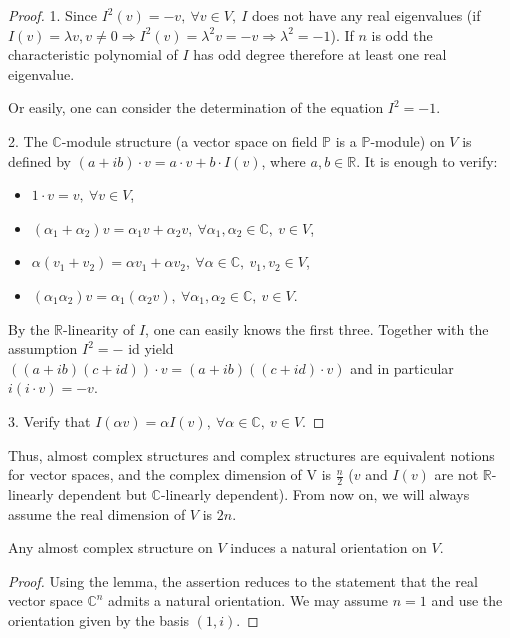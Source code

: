 \documentclass{ctexart}
\begin{document}
\begin{proof}[Proof]
    1. Since $I^{2}(v)=-v,\  \forall v \in V ,\  I$ does not have any real eigenvalues (if $I(v)=\lambda v, v \neq 0 \Rightarrow I^{2}(v)=\lambda^{2} v=-v \Rightarrow \lambda^{2}=-1$).
    If $n$ is odd the characteristic polynomial of $I$ has odd degree therefore at least one real eigenvalue.

    Or easily, one can consider the determination of the equation $I^2=-1$.

    2. The $\mathbb{C}$-module structure (a vector space on field $\mathbb{P}$ is a $\mathbb{P}$-module) on $V$ is defined by $(a+i b) \cdot v=a \cdot v+b \cdot I(v)$, where $a, b \in \mathbb{R}$. 
    It is enough to verify: 
    \begin{itemize}
        \item $1\cdot v=v,\ \forall v\in V$, 
        \item $(\alpha_1+\alpha_2)v=\alpha_1 v+\alpha_2 v,\ \forall \alpha_1,\alpha_2\in \mathbb{C},\ v\in V$, 
        \item $\alpha(v_1+v_2)=\alpha v_1+ \alpha v_2,\ \forall \alpha\in \mathbb{C},\ v_1,v_2\in V$, 
        \item $(\alpha_1 \alpha_2)v=\alpha_1(\alpha_2v),\ \forall \alpha_1,\alpha_2\in \mathbb{C},\ v\in V$. 
    \end{itemize}
    By the $\mathbb{R}$-linearity of $I$, one can easily knows the first three. Together with the assumption $I^{2}=-$ id yield $((a+i b)(c+i d)) \cdot v=(a+i b)((c+i d) \cdot v)$ and 
    in particular $i(i \cdot v)=-v$.

    3. Verify that $I(\alpha v)=\alpha I(v),\ \forall \alpha\in \mathbb{C},\ v\in V.$
\end{proof}

Thus, almost complex structures and complex structures are equivalent notions for vector spaces, and the complex dimension of V is $\frac{n}{2}$ ($v$ and $I(v)$ are not $\mathbb{R}$-linearly dependent but
$\mathbb{C}$-linearly dependent). From now on, we will always assume the real dimension of $V$ is $2n$. 
\begin{corollary}
  Any almost complex structure on $V$ induces a natural orientation on $V$. 
\end{corollary}
\begin{proof}[Proof]
  Using the lemma, the assertion reduces to the statement that the real vector space $\mathbb{C}^n$ admits a natural orientation. 
  We may assume $n = 1$ and use the orientation given by the basis $(1, i)$. 
\end{proof}
\end{document}
